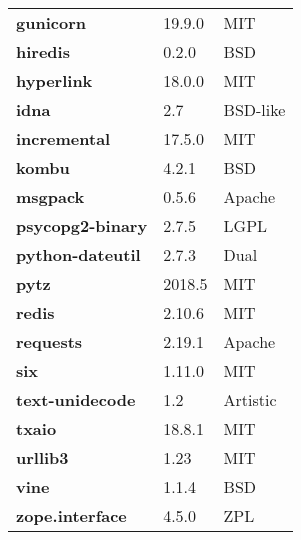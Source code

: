 \begin{longtable}{| p{} | p{} | p{} |}
\textbf{gunicorn} & 19.9.0 & MIT \\
\textbf{hiredis} & 0.2.0 & BSD \\
\textbf{hyperlink} & 18.0.0 & MIT \\
\textbf{idna} & 2.7 & BSD-like \\
\textbf{incremental} & 17.5.0 & MIT \\
\textbf{kombu} & 4.2.1 & BSD \\
\textbf{msgpack} & 0.5.6 & Apache \\
\textbf{psycopg2-binary} & 2.7.5 & LGPL \\
\textbf{python-dateutil} & 2.7.3 & Dual \\
\textbf{pytz} & 2018.5 & MIT \\
\textbf{redis} & 2.10.6 & MIT \\
\textbf{requests} & 2.19.1 & Apache \\
\textbf{six} & 1.11.0 & MIT \\
\textbf{text-unidecode} & 1.2 & Artistic \\
\textbf{txaio} & 18.8.1 & MIT \\
\textbf{urllib3} & 1.23 & MIT \\
\textbf{vine} & 1.1.4 & BSD \\
\textbf{zope.interface} & 4.5.0 & ZPL \\
\hline
\end{longtable}
